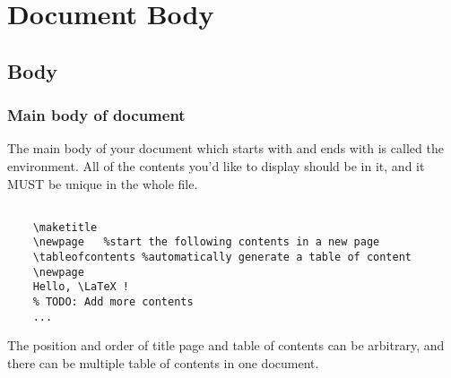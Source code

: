 
\section{Document Body}

\begin{frame}
\end{frame}

\subsection{Body}
\begin{frame}[fragile]
	\frametitle{Main body of document}
	The main body of your document which starts with \texttt{} and ends with \texttt{} is called the  environment. All of the contents you'd like to display should be in it, and it \alert{MUST} be \alert{unique} in the whole file.
	\begin{example}
		\begin{verbatim}

    \maketitle
    \newpage   %start the following contents in a new page
    \tableofcontents %automatically generate a table of content
    \newpage
    Hello, \LaTeX !
    % TODO: Add more contents
    ...

		\end{verbatim}
	\end{example}
	The position and order of title page and table of contents can be arbitrary, and there can be multiple table of contents in one document.
\end{frame}

